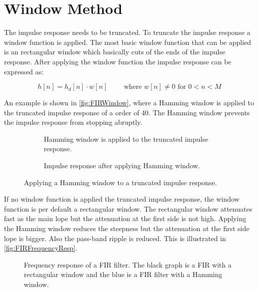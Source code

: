 \section{Window Method}
The impulse response needs to be truncated. To truncate the impulse response a window function is applied. The most basic window function that can be applied is an rectangular window which basically cuts of the ends of the impulse response. After applying the window function the impulse response can be expressed as:

\begin{equation}
h[n]=h_d[n]\cdot w[n]\qquad\textrm{ where } w[n]\neq0 \textrm{ for } 0<n<M
\end{equation}

An example is shown in \autoref{fig:FIRWindow}, where a Hamming window is applied to the truncated impulse response of a order of 40. The Hamming window prevents the impulse response from stopping abruptly.

\begin{figure}[H]
\centering
\begin{subfigure}[t]{0.45\textwidth}
    \centering
    
    \caption{Hamming window is applied to the truncated impulse response.}
    \label{fig:FIRTruncation}
\end{subfigure}
\begin{subfigure}[t]{0.45\textwidth}
    \centering
    
    \caption{Impulse response after applying Hamming window.}
    \label{fig:FIRHamming}
\end{subfigure}
\caption{Applying a Hamming window to a truncated impulse response.}
\label{fig:FIRWindow}
\end{figure} 

If no window function is applied the truncated impulse response, the window function is per default a rectangular window. The rectangular window attenuates fast as the main lope but the attenuation at the first side is not high. Applying the Hamming window reduces the steepness but the attenuation at the first side lope is bigger. Also the pass-band ripple is reduced. This is illustrated in \autoref{fig:FIRFrequencyResp}.

\begin{figure}[H]
    \centering
    
    \caption{Frequency response of a FIR filter. The black graph is a FIR with a rectangular window and the blue is a FIR filter with a Hamming window.}
\label{fig:FIRFrequencyResp}
\end{figure}  

